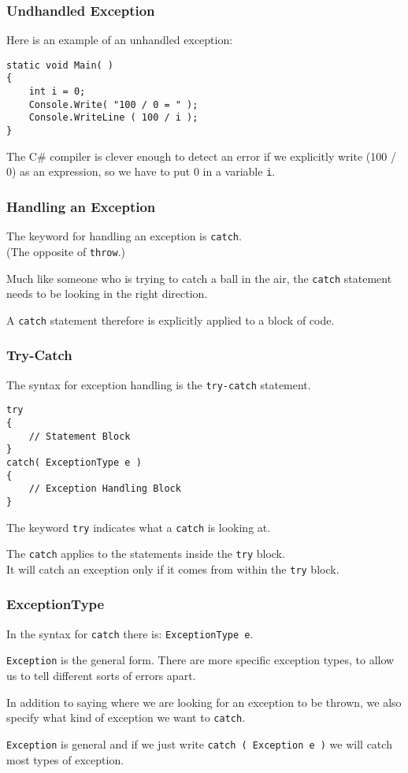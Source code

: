 \begin{frame}[fragile]
\frametitle{Undhandled Exception}

Here is an example of an unhandled exception:

\begin{verbatim}
static void Main( )
{
    int i = 0;		
    Console.Write( "100 / 0 = " );
    Console.WriteLine ( 100 / i );
}
\end{verbatim}

The C\# compiler is clever enough to detect an error if we explicitly write (100 / 0) as an expression, so we have to put 0 in a variable \texttt{i}.

\end{frame}


\begin{frame}
\frametitle{Handling an Exception}

The keyword for handling an exception is \texttt{catch}.\\
\quad (The opposite of \texttt{throw}.)

Much like someone who is trying to catch a ball in the air, the \texttt{catch} statement needs to be looking in the right direction.

A \texttt{catch} statement therefore is explicitly applied to a block of code.

\end{frame}

\begin{frame}[fragile]
\frametitle{Try-Catch}
The syntax for exception handling is the \texttt{try-catch} statement.

\begin{verbatim}
try
{
    // Statement Block
}
catch( ExceptionType e )
{
    // Exception Handling Block
}    
\end{verbatim}

The keyword \texttt{try} indicates what a \texttt{catch} is looking at.

The \texttt{catch} applies to the statements inside the \texttt{try} block.\\
\quad It will catch an exception only if it comes from within the \texttt{try} block.

\end{frame}

\begin{frame}
\frametitle{ExceptionType}

In the syntax for \texttt{catch} there is: \texttt{ExceptionType e}.

\texttt{Exception} is the general form. There are more specific exception types, to allow us to tell different sorts of errors apart.

In addition to saying where we are looking for an exception to be thrown, we also specify what kind of exception we want to \texttt{catch}.

\texttt{Exception} is general and if we just write \texttt{catch ( Exception e )} we will catch most types of exception.

\end{frame}

